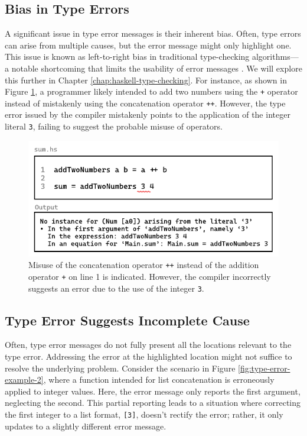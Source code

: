  \subsection{Bias in Type Errors} 
 \label{subsec:bias}
 
A significant issue in type error messages is their inherent bias. Often, type errors can arise from multiple causes, but the error message might only highlight one. This issue is known as left-to-right bias in traditional type-checking algorithms—a notable shortcoming that limits the usability of error messages \cite{McAdam2002-vb, Lee1998-fx, Chen2014-ev}. We will explore this further in Chapter \ref{chap:haskell-type-checking}. For instance, as shown in Figure \ref{fig:type-error-example}, a programmer likely intended to add two numbers using the \texttt{+} operator instead of mistakenly using the concatenation operator \texttt{++}. However, the type error issued by the compiler mistakenly points to the application of the integer literal \texttt{3}, failing to suggest the probable misuse of operators.

 \begin{figure}[hbt]
  \includegraphics[width=\linewidth]{TypeErrorExample}
  \caption{
    \label{fig:type-error-example}
    Misuse of the concatenation operator \texttt{++} instead of the addition operator \texttt{+} on line 1 is indicated. However, the compiler incorrectly suggests an error due to the use of the integer \texttt{3}.
    }
\end{figure}


\subsection{Type Error Suggests Incomplete Cause}
\label{subsec:imcomplete}

Often, type error messages do not fully present all the locations relevant to the type error. Addressing the error at the highlighted location might not suffice to resolve the underlying problem. Consider the scenario in Figure \ref{fig:type-error-example-2}, where a function intended for list concatenation is erroneously applied to integer values. Here, the error message only reports the first argument, neglecting the second. This partial reporting leads to a situation where correcting the first integer to a list format, \texttt{[3]}, doesn't rectify the error; rather, it only updates to a slightly different error message. 



